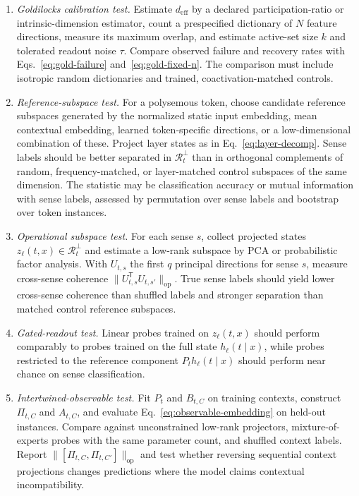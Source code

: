 \documentclass[
  aps,
  reprint,
  superscriptaddress,
  floatfix,
  nofootinbib,
  longbibliography
]{revtex4-2}
\newcommand{\deff}{d_{\mathrm{eff}}}
\newcommand{\T}{^{\mathsf{T}}}
\newcommand{\opnorm}[1]{\lVert #1 \rVert_{\mathrm{op}}}
\begin{document}
\begin{enumerate}
\item \emph{Goldilocks calibration test.}
Estimate $\deff$ by a declared participation-ratio or intrinsic-dimension
estimator, count a prespecified dictionary of $N$ feature directions, measure
its maximum overlap, and estimate active-set size $k$ and tolerated readout
noise $\tau$.  Compare observed failure and recovery rates with
Eqs.~\eqref{eq:gold-failure} and~\eqref{eq:gold-fixed-n}.  The comparison must
include isotropic random dictionaries and trained, coactivation-matched
controls.

\item \emph{Reference-subspace test.}
For a polysemous token, choose candidate reference subspaces generated
by the normalized static input embedding, mean contextual embedding,
learned token-specific directions, or a low-dimensional combination of
these. Project layer states as in Eq.~\eqref{eq:layer-decomp}. Sense labels
should be better separated in $\mathcal R_t^\perp$ than in orthogonal
complements of random, frequency-matched, or layer-matched control
subspaces of the same dimension. The statistic may be classification accuracy or
mutual information with sense labels, assessed by permutation over
sense labels and bootstrap over token instances.

\item \emph{Operational subspace test.}
For each sense $s$, collect projected states
$z_\ell(t,x)\in\mathcal R_t^\perp$ and estimate a low-rank subspace by PCA or
probabilistic factor analysis. With $U_{t,s}$ the first $q$ principal
directions for sense $s$, measure cross-sense coherence
$\opnorm{U_{t,s}\T U_{t,s'}}$. True sense labels should yield lower
cross-sense coherence than shuffled labels and stronger separation than
matched control reference subspaces.

\item \emph{Gated-readout test.}
Linear probes trained on $z_\ell(t,x)$ should perform comparably to
probes trained on the full state $h_\ell(t\mid x)$, while probes
restricted to the reference component $P_t h_\ell(t\mid x)$ should perform
near chance on sense classification.

\item \emph{Intertwined-observable test.}
Fit $P_t$ and $B_{t,C}$ on training contexts, construct $\Pi_{t,C}$ and
$A_{t,C}$, and evaluate Eq.~\eqref{eq:observable-embedding} on held-out
instances. Compare against unconstrained low-rank projectors, mixture-of-
experts probes with the same parameter count, and shuffled context labels.
Report $\opnorm{[\Pi_{t,C},\Pi_{t,C'}]}$ and test whether reversing sequential
context projections changes predictions where the model claims contextual
incompatibility.


\end{enumerate}
\end{document}
